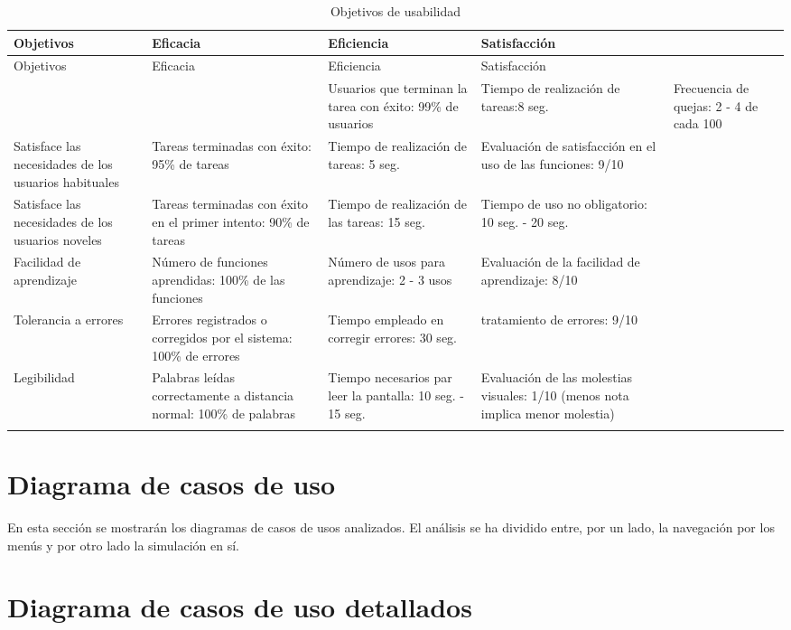 \begin{longtable}[H]{|p{3cm}|p{3cm}|p{3cm}|p{3cm}|}
	\hline
	Objetivos & Eficacia & Eficiencia  & Satisfacción \\
	\hline \hline
	\endfirsthead
	
	\hline
	Objetivos  & Eficacia & Eficiencia  & Satisfacción \\
	\hline \hline
	\endhead
	
	\multicolumn{2}{c}{}
	\endfoot
	
	\endlastfoot
	
			Utilizabilidad global  & Usuarios que terminan la tarea con éxito: 99\% de usuarios  & Tiempo de realización de tareas:8 seg.  & Frecuencia de quejas: 2 - 4 de cada 100 \\ \hline
			
			Satisface las necesidades de los usuarios habituales  & Tareas terminadas con éxito: 95\% de tareas  & Tiempo de realización de tareas: 5 seg. & Evaluación de satisfacción en el uso de las funciones: 9/10\\ \hline
			
			Satisface las necesidades de los usuarios noveles   & Tareas terminadas con éxito en el primer intento: 90\% de tareas  & Tiempo de realización de las tareas: 15 seg. & Tiempo de uso no obligatorio: 10 seg. - 20 seg. \\ \hline
			
			Facilidad de aprendizaje  & Número de funciones aprendidas: 100\% de las funciones  & Número de usos para aprendizaje: 2 - 3 usos  & Evaluación de la facilidad de aprendizaje: 8/10 \\ \hline
			
			Tolerancia a errores  & Errores registrados o corregidos por el sistema: 100\% de errores & Tiempo empleado en corregir errores: 30 seg. & tratamiento de errores: 9/10 \\ \hline
			
			Legibilidad  & Palabras leídas correctamente a distancia normal: 100\% de palabras  & Tiempo necesarios par leer la pantalla: 10 seg. - 15 seg.  & Evaluación de las molestias visuales: 1/10 (menos nota implica menor molestia)  \\ \hline
	
	\caption{Objetivos de usabilidad}
	\label{tabla:objetivosUsabilidad}
\end{longtable}

\newpage

\section{Diagrama de casos de uso}

En esta sección se mostrarán los diagramas de casos de usos analizados. El análisis se ha dividido entre, por un lado, la navegación por los menús y por otro lado la simulación en sí. 



\section{Diagrama de casos de uso detallados}


